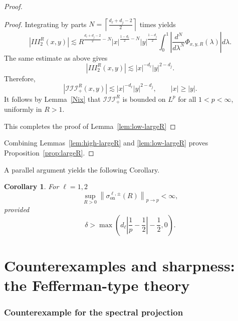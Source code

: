 \documentclass[12pt]{amsart}
\newtheorem{coro}[theorem]{Corollary}
\begin{document}
\begin{proof}
\begin{proof}
Integrating by parts $N=\left\lceil \frac{d_\ell+d_j-2}{2}\right\rceil$ times yields 
\begin{equation*}
|III_2^R(x,y)| \lesssim R^{\frac{d_\ell+d_j-2}{2}-N}
|x|^{\frac{1-d_\ell}{2}-N}
|y|^{\frac{1-d_j}{2}}
\int_0^1
\left|
\frac{d^N}{d\lambda^N}\Phi_{x,y,R}(\lambda)
\right| d\lambda.
\end{equation*}
The same estimate as above gives
\begin{equation*}
  |III_2^R(x,y)|\lesssim |x|^{-d_\ell}|y|^{2-d_j}.  
\end{equation*}
Therefore,
\begin{equation*}
    |\mathcal{III}_{+}^R(x,y)|\lesssim |x|^{-d_\ell}|y|^{2-d_j},
\qquad |x|\ge |y|.
\end{equation*}
It follows by Lemma~\ref{Nix} that $\mathcal{III}_{+}^R$ is bounded on $L^p$ for all $1<p<\infty$, uniformly in $R>1$. 

This completes the proof of Lemma~\ref{lem:low-largeR}
\end{proof}


Combining Lemmas~\ref{lem:high-largeR} and \ref{lem:low-largeR} proves Proposition~\ref{prop:largeR}. 
\end{proof}







A parallel argument yields the following Corollary.


\begin{coro}\label{cor1}
For $\ell=1,2$
\begin{equation*}
    \sup_{R>0}\left\| \sigma_{\mathrm{on}}^{\ell,\pm}(R) \right\|_{p\to p}<\infty,
\end{equation*}
provided
\begin{equation*}
\delta>\max\left(d_\ell\left|\frac1p-\frac12\right|-\frac12,0\right).
\end{equation*}

\end{coro}


\part{Counterexamples and sharpness: the Fefferman-type theory}








\section{Counterexample for the spectral projection}\label{SP} 
\end{document}
